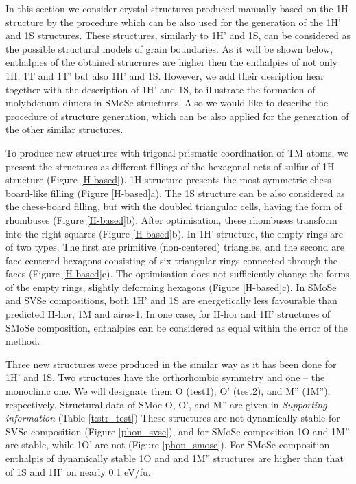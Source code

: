 \documentclass[a4paperm]{article}
\begin{document}
In this section we consider crystal structures produced manually based on the 1H structure by the procedure which can be also used for the generation of the 1H' and 1S structures.
These structures, similarly to 1H' and 1S, can be considered as the possible structural models of grain boundaries.
As it will be shown below, enthalpies of the obtained strucrures are higher then the enthalpies of not only 1H, 1T and 1T' but also 1H' and 1S.
However, we add their desription hear together with the description of 1H' and 1S, to illustrate the formation of molybdenum dimers in SMoSe structures.
Also we would like to describe the procedure of structure generation, which can be also applied for the generation of the other similar structures.

To produce new structures with trigonal prismatic coordination of TM atoms, we present the structures as different fillings of the hexagonal nets of sulfur of 1H structure (Figure \ref{H-based}).
1H structure presents the most symmetric chess-board-like filling (Figure \ref{H-based}a).
The 1S structure can be also considered as the chess-board filling, but with the doubled triangular cells, having the form of rhombuses (Figure \ref{H-based}b).
After optimisation, these rhombuses transform into the right squares (Figure \ref{H-based}b).
In 1H' structure, the empty rings are of two types.
The first are primitive (non-centered) triangles, and the second are face-centered hexagons consisting of six triangular rings connected through the faces (Figure \ref{H-based}c).
The optimisation does not sufficiently change the forms of the empty rings, slightly deforming hexagons (Figure \ref{H-based}c).
In SMoSe and SVSe compositions, both 1H' and 1S are energetically less favourable than predicted H-hor, 1M and airss-1.
In one case, for H-hor and 1H' structures of SMoSe composition, enthalpies can be considered as equal within the error of the method.

Three new structures were produced in the similar way as it has been done for 1H' and 1S.
Two structures have the orthorhombic symmetry and one – the monoclinic one.
We will designate them O (test1), O' (test2), and M'' (1M''), respectively.
Structural data of SMoe-O, O', and M'' are given in {\it Supporting information} (Table \ref{t:str_test})
These structures are not dynamically stable for SVSe composition (Figure \ref{phon_svse}), and for SMoSe composition 1O and 1M'' are stable, while 1O' are not (Figure \ref{phon_smose}).
For SMoSe composition enthalpis of dynamically stable 1O and and 1M'' structures are higher than that of  1S and 1H' on nearly 0.1 eV/fu.
\end{document}
